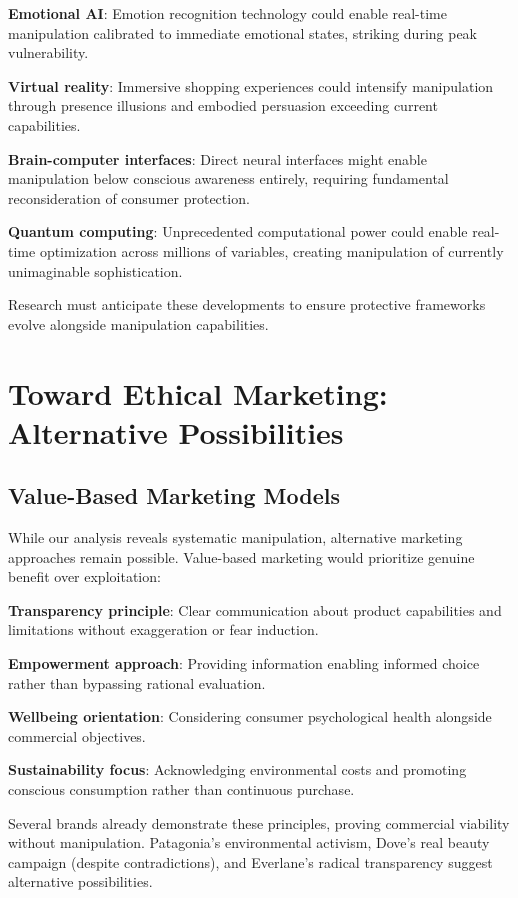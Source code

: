 \textbf{Emotional AI}: Emotion recognition technology could enable real-time manipulation calibrated to immediate emotional states, striking during peak vulnerability.

\textbf{Virtual reality}: Immersive shopping experiences could intensify manipulation through presence illusions and embodied persuasion exceeding current capabilities.

\textbf{Brain-computer interfaces}: Direct neural interfaces might enable manipulation below conscious awareness entirely, requiring fundamental reconsideration of consumer protection.

\textbf{Quantum computing}: Unprecedented computational power could enable real-time optimization across millions of variables, creating manipulation of currently unimaginable sophistication.

Research must anticipate these developments to ensure protective frameworks evolve alongside manipulation capabilities.

\section{Toward Ethical Marketing: Alternative Possibilities}
\label{sec:alternatives}

\subsection{Value-Based Marketing Models}

While our analysis reveals systematic manipulation, alternative marketing approaches remain possible. Value-based marketing would prioritize genuine benefit over exploitation:

\textbf{Transparency principle}: Clear communication about product capabilities and limitations without exaggeration or fear induction.

\textbf{Empowerment approach}: Providing information enabling informed choice rather than bypassing rational evaluation.

\textbf{Wellbeing orientation}: Considering consumer psychological health alongside commercial objectives.

\textbf{Sustainability focus}: Acknowledging environmental costs and promoting conscious consumption rather than continuous purchase.

Several brands already demonstrate these principles, proving commercial viability without manipulation. Patagonia's environmental activism, Dove's real beauty campaign (despite contradictions), and Everlane's radical transparency suggest alternative possibilities.

